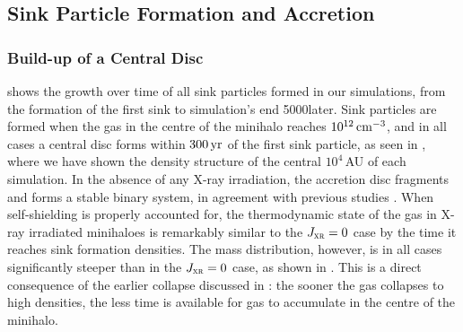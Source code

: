 \documentclass[../thesis.tex]{subfiles}
\begin{document}
\subsection{Sink Particle Formation and Accretion}
\subsubsection{Build-up of a Central Disc}
  shows the growth over time of all sink particles formed in our simulations, from the formation of the first sink to simulation's end 5000\yr later.  Sink particles are formed when the gas in the centre of the minihalo reaches $10^{12}\,\mathrm{cm}^{-3}$, and in all cases a central disc forms within $300\,\mathrm{yr}$ of the first sink particle, as seen in , where we have shown the density structure of the central $10^4\,$AU of each simulation.  In the absence of any X-ray irradiation, the accretion disc fragments and forms a stable binary system, in agreement with previous studies \citep[e.g.,][]{ StacyGreifBromm2010, Clarketal2011a, Clarketal2011b, Greifetal2011, Greifetal2012}. When self-shielding is properly accounted for, the thermodynamic state of the gas in X-ray irradiated minihaloes is remarkably similar to the $J_{\textsc{xr}}=0$ case by the time it reaches sink formation densities. The mass distribution, however, is in all cases significantly steeper than in the $J_{\textsc{xr}}=0$ case, as shown in . This is a direct consequence of the earlier collapse discussed in : the sooner the gas collapses to high densities, the less time is available for gas to accumulate in the centre of the minihalo. 
\end{document}
